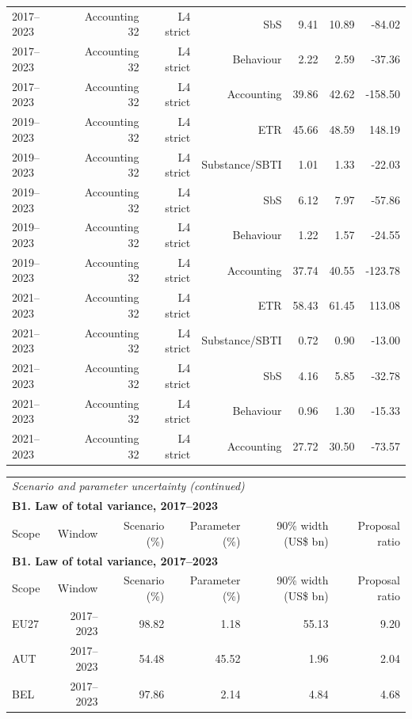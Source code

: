 {\begin{longtable}{@{}lrrrrrr@{}}
2017–2023 & Accounting 32 & L4 strict & SbS &  9.41 & 10.89 &  -84.02 \\
2017–2023 & Accounting 32 & L4 strict & Behaviour &  2.22 &  2.59 &  -37.36 \\
2017–2023 & Accounting 32 & L4 strict & Accounting & 39.86 & 42.62 & -158.50 \\
2019–2023 & Accounting 32 & L4 strict & ETR & 45.66 & 48.59 &  148.19 \\
2019–2023 & Accounting 32 & L4 strict & Substance/SBTI &  1.01 &  1.33 &  -22.03 \\
2019–2023 & Accounting 32 & L4 strict & SbS &  6.12 &  7.97 &  -57.86 \\
2019–2023 & Accounting 32 & L4 strict & Behaviour &  1.22 &  1.57 &  -24.55 \\
2019–2023 & Accounting 32 & L4 strict & Accounting & 37.74 & 40.55 & -123.78 \\
2021–2023 & Accounting 32 & L4 strict & ETR & 58.43 & 61.45 &  113.08 \\
2021–2023 & Accounting 32 & L4 strict & Substance/SBTI &  0.72 &  0.90 &  -13.00 \\
2021–2023 & Accounting 32 & L4 strict & SbS &  4.16 &  5.85 &  -32.78 \\
2021–2023 & Accounting 32 & L4 strict & Behaviour &  0.96 &  1.30 &  -15.33 \\
2021–2023 & Accounting 32 & L4 strict & Accounting & 27.72 & 30.50 &  -73.57 \\
\end{longtable}
\addtocounter{table}{-1}
\begin{longtable}{@{}lrrrrr@{}}
\multicolumn{6}{l}{\textit{Scenario and parameter uncertainty (continued)}} \\
\multicolumn{6}{l}{\textbf{B1. Law of total variance, 2017–2023}} \\
\toprule
Scope & Window & Scenario (\%) & Parameter (\%) & 90\% width (US\$ bn) & Proposal ratio \\
\midrule
\endfirsthead
\multicolumn{6}{l}{\textbf{B1. Law of total variance, 2017–2023}} \\
\toprule
Scope & Window & Scenario (\%) & Parameter (\%) & 90\% width (US\$ bn) & Proposal ratio \\
\midrule
\endhead
\midrule
\endfoot
\bottomrule
\endlastfoot
EU27 & 2017–2023 & 98.82 &  1.18 & 55.13 &  9.20 \\
AUT & 2017–2023 & 54.48 & 45.52 &  1.96 &  2.04 \\
BEL & 2017–2023 & 97.86 &  2.14 &  4.84 &  4.68 \\

\end{longtable}}
